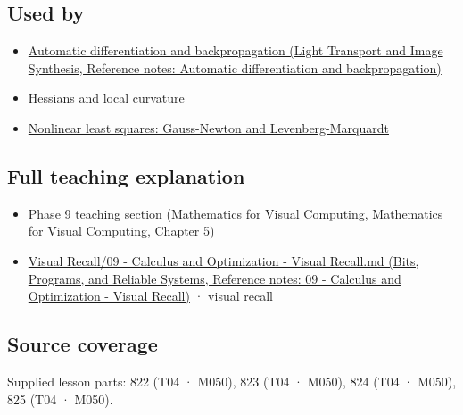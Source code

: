 \subsection{Used by}\label{appendix-d8a7ddb675eb-used-by}

\begin{itemize}
\tightlist
\item
  \href{../04-Light-Transport-and-Image-Synthesis/main.pdf\#nameddest=appendix-40df0855b4a7}{Automatic differentiation and backpropagation (Light Transport and Image Synthesis, Reference notes: Automatic differentiation and backpropagation)}
\item
  \hyperref[appendix-6ac071f8b50c]{Hessians and local curvature}
\item
  \hyperref[appendix-2c2df8345991]{Nonlinear least squares: Gauss-Newton and Levenberg-Marquardt}
\end{itemize}

\subsection{Full teaching explanation}\label{appendix-d8a7ddb675eb-full-teaching-explanation}

\begin{itemize}
\tightlist
\item
  \href{../02-Mathematics-for-Visual-Computing/main.pdf\#nameddest=02-foundations-ii-ch021-jacobians-curvature-and-local-approximation}{Phase 9 teaching section (Mathematics for Visual Computing, Mathematics for Visual Computing, Chapter 5)}
\item
  \href{../01-Bits-Programs-and-Reliable-Systems/main.pdf\#nameddest=appendix-adf48f5dc5c1}{Visual Recall/09 - Calculus and Optimization - Visual Recall.md (Bits, Programs, and Reliable Systems, Reference notes: 09 - Calculus and Optimization - Visual Recall)} · visual recall
\end{itemize}

\subsection{Source coverage}\label{appendix-d8a7ddb675eb-source-coverage}

Supplied lesson parts: 822 (T04 · M050), 823 (T04 · M050), 824 (T04 · M050), 825 (T04 · M050).

